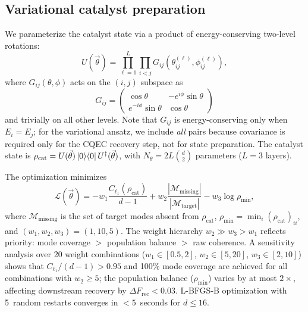\documentclass[prx,twocolumn,superscriptaddress,longbibliography,floatfix]{revtex4-2}
\begin{document}
\subsection{Variational catalyst preparation}
\label{sec:variational}

We parameterize the catalyst state via a product of energy-conserving two-level rotations:
\begin{equation}
U(\vec\theta) = \prod_{\ell=1}^{L} \prod_{i < j} G_{ij}(\theta_{ij}^{(\ell)}, \phi_{ij}^{(\ell)}),
\label{eq:ansatz}
\end{equation}
where $G_{ij}(\theta, \phi)$ acts on the $(i, j)$ subspace as
\begin{equation}
G_{ij} = \begin{pmatrix} \cos\theta & -e^{i\phi}\sin\theta \\ e^{-i\phi}\sin\theta & \cos\theta \end{pmatrix}
\label{eq:ec_rotation}
\end{equation}
and trivially on all other levels.
Note that $G_{ij}$ is energy-conserving only when $E_i = E_j$; for the variational ansatz, we include \emph{all} pairs because covariance is required only for the CQEC recovery step, not for state preparation.
The catalyst state is $\rho_\mathrm{cat} = U(\vec\theta)\ket{0}\!\bra{0}U^\dagger(\vec\theta)$, with $N_\theta = 2L\binom{d}{2}$ parameters ($L = 3$ layers).

The optimization minimizes
\begin{equation}
\mathcal{L}(\vec\theta) = -w_1 \frac{C_{\ell_1}(\rho_\mathrm{cat})}{d-1} + w_2 \frac{|\mathcal{M}_\mathrm{missing}|}{|\mathcal{M}_\mathrm{target}|} - w_3 \log \rho_\mathrm{min},
\label{eq:var_cost}
\end{equation}
where $\mathcal{M}_\mathrm{missing}$ is the set of target modes absent from $\rho_\mathrm{cat}$, $\rho_\mathrm{min} = \min_i (\rho_\mathrm{cat})_{ii}$, and $(w_1, w_2, w_3) = (1, 10, 5)$.
The weight hierarchy $w_2 \gg w_3 > w_1$ reflects priority: mode coverage $>$ population balance $>$ raw coherence.
A sensitivity analysis over 20 weight combinations ($w_1 \in [0.5, 2]$, $w_2 \in [5, 20]$, $w_3 \in [2, 10]$) shows that $C_{\ell_1}/(d-1) > 0.95$ and 100\% mode coverage are achieved for all combinations with $w_2 \geq 5$; the population balance ($\rho_\mathrm{min}$) varies by at most $2\times$, affecting downstream recovery by $\Delta F_\mathrm{rec} < 0.03$.
L-BFGS-B optimization with 5~random restarts converges in $<5$~seconds for $d \leq 16$.
\end{document}
